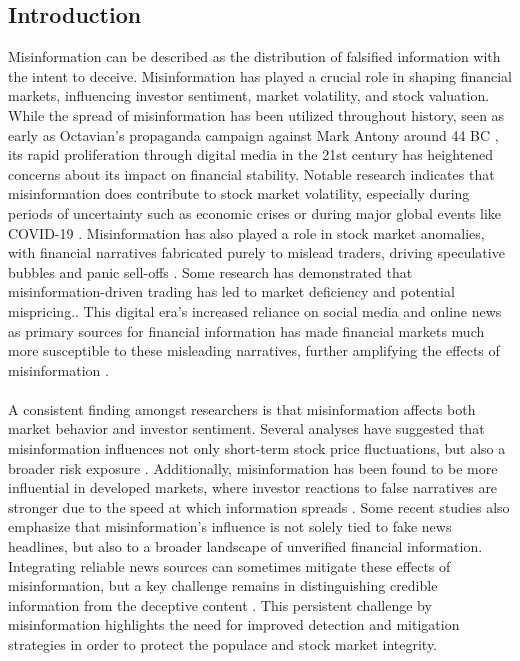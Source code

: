 \documentclass{article}
\begin{document}
\subsection{Introduction}

Misinformation can be described as the distribution of falsified information with the intent to deceive. Misinformation has played a crucial role in shaping financial markets, influencing investor sentiment, market volatility, and stock valuation. While the spread of misinformation has been utilized throughout history, seen as early as Octavian’s propaganda campaign against Mark Antony around 44 BC \cite{source28}, its rapid proliferation through digital media in the 21st century has heightened concerns about its impact on financial stability. Notable research indicates that misinformation does contribute to stock market volatility, especially during periods of uncertainty such as economic crises or during major global events like COVID-19 \cite{source16, source19, source24}. Misinformation has also played a role in stock market anomalies, with financial narratives fabricated purely to mislead traders, driving speculative bubbles and panic sell-offs \cite{source17, source23}. Some research has demonstrated that misinformation-driven trading has led to market deficiency and potential mispricing.\cite{source20, source27}. This digital era’s increased reliance on social media and online news as primary sources for financial information has made financial markets much more susceptible to these misleading narratives, further amplifying the effects of misinformation \cite{source18, source22, source27}.
\\\\
A consistent finding amongst researchers is that misinformation affects both market behavior and investor sentiment. Several analyses have suggested that misinformation influences not only short-term stock price fluctuations, but also a broader risk exposure \cite{source16, source24, source29}. Additionally, misinformation has been found to be more influential in developed markets, where investor reactions to false narratives are stronger due to the speed at which information spreads \cite{source29, source30}. Some recent studies also emphasize that misinformation's influence is not solely tied to fake news headlines, but also to a broader landscape of unverified financial information. Integrating reliable news sources can sometimes mitigate these effects of misinformation, but a key challenge remains in distinguishing credible information from the deceptive content \cite{source19, source28, source30}. This persistent challenge by misinformation highlights the need for improved detection and mitigation strategies in order to protect the populace and stock market integrity.
\end{document}
